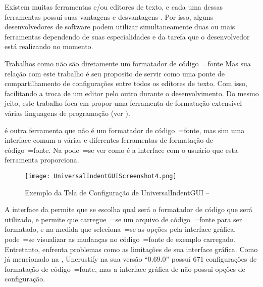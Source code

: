 Existem muitas ferramentas e\slash{}ou editores de texto,
e cada uma dessas ferramentas possuí suas vantagens e
desvantagens \cite{prettyPrintingOfVisualSentences,anAbstractPrettyPrinter,improvingRefactoringSpeed}.
Por isso,
alguns desenvolvedores de software podem utilizar simultaneamente duas ou
mais ferramentas dependendo de suas especialidades e
da tarefa que o desenvolvedor está realizando no momento.

Trabalhos como  não são diretamente um formatador de código~=fonte Mas sua relação com este trabalho é seu proposito de servir como uma ponte de compartilhamento de configurações entre todos os editores de texto.
Com isso,
facilitando a troca de um editor pelo outro durante o desenvolvimento.
Do mesmo jeito,
este trabalho foca em propor uma ferramenta de formatação extensível várias linguagens de programação (ver ).

 é outra ferramenta que não é um formatador de código~=fonte,
mas sim uma interface comum a várias e
diferentes ferramentas de formatação de código~=fonte.
Na  pode~=se ver como é a interface com o usuário que esta ferramenta proporciona.

\begin{figure}[h]
\centering
\texttt{[image: UniversalIndentGUIScreenshot4.png]}
\caption[Exemplo da Tela de Configuração de UniversalIndentGUI]{Exemplo da Tela de Configuração de UniversalIndentGUI -- \cite{UniversalIndentGUIScreenshot4}}
\label{UniversalIndentGUIScreenshot4}
\end{figure}

A interface da  permite que se escolha qual será o formatador de código que será utilizado,
e permite que carregue~=se um arquivo de código~=fonte para ser formatado,
e na medida que seleciona~=se as opções pela interface gráfica,
pode~=se visualizar as mudanças no código~=fonte de exemplo carregado.
Entretanto,
 enfrenta problemas como as limitações de sua interface gráfica.
Como já mencionado na ,
Uncrustify na sua versão ``0.69.0'' possuí 671 configurações de formatação de código~=fonte,
mas a interface gráfica de  não possui opções de configuração.

